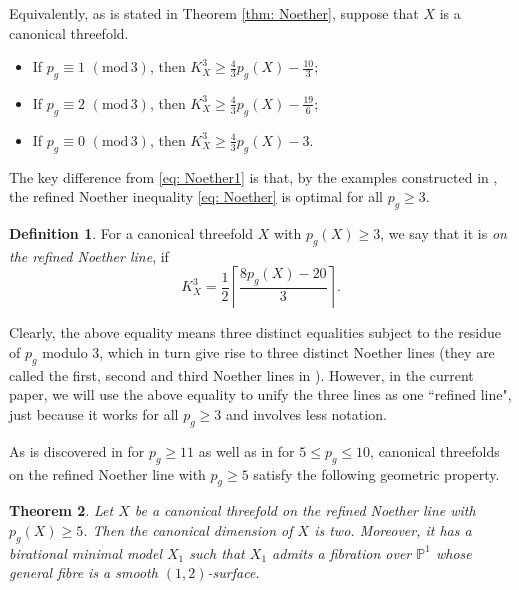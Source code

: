 \documentclass[a4paper,11pt]{amsart}
\newcommand{\PP}{\ensuremath{\mathbb{P}}}
\newtheorem{thm}{Theorem}[section]
\theoremstyle{definition}
\newtheorem{df}[thm]{Definition}
\theoremstyle{remark}
\numberwithin{equation}{section}
\begin{document}
Equivalently, as is stated in Theorem \ref{thm: Noether}, suppose that $X$ is a canonical threefold.
\begin{itemize}
    \item [(1)] If $p_g \equiv 1$ $(\mathrm{mod}\, 3)$, then $K_X^3 \ge \frac{4}{3}p_g(X) - \frac{10}{3}$;

    \item [(2)] If $p_g \equiv 2$ $(\mathrm{mod}\, 3)$, then $K_X^3 \ge \frac{4}{3}p_g(X) - \frac{19}{6}$;

    \item [(3)] If $p_g \equiv 0$ $(\mathrm{mod}\, 3)$, then $K_X^3 \ge \frac{4}{3}p_g(X) - 3$.
\end{itemize}
The key difference from \eqref{eq: Noether1} is that, by the examples constructed in \cite{CP,HZ}, the refined Noether inequality \eqref{eq: Noether} is optimal for all $p_g \ge 3$. %

\begin{df} \label{def: Noether line}
	For a canonical threefold $X$ with $p_g(X) \ge 3$, we say that it is \emph{on the refined Noether line}, if 
    $$
    K_X^3 = \frac{1}{2} \left \lceil {\frac{8p_g(X) - 20}{3}} \right \rceil.
    $$
\end{df}

Clearly, the above equality means three distinct equalities subject to the residue of $p_g$ modulo $3$, which in turn give rise to three distinct Noether lines (they are called the first, second and third Noether lines in \cite{HZ}). However, in the current paper, we will use the above equality to unify the three lines as one ``refined line", just because it works for all $p_g \ge 3$ and involves less notation.

As is discovered in \cite{HZ} for $p_g \ge 11$ as well as in \cite{CHJ} for $5 \le p_g \le 10$, canonical threefolds on the refined Noether line with $p_g \ge 5$ satisfy the following geometric property.

\begin{thm} \label{thm: fibration exsits}
    Let $X$ be a canonical threefold on the refined Noether line with $p_g(X) \ge 5$. Then the canonical dimension of $X$ is two. Moreover, it has a birational minimal model $X_1$ such that $X_1$ admits a fibration over $\PP^1$ whose general fibre is a smooth $(1, 2)$-surface.
\end{thm}
\end{document}

